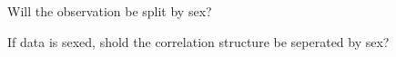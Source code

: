  {Will the observation be split by sex?}

 {If data is sexed, shold the correlation structure be seperated by sex?}

\subsubsection[Multinomial]{}

\subsubsection[Normal]{}

\subsubsection[Pseudo]{}

